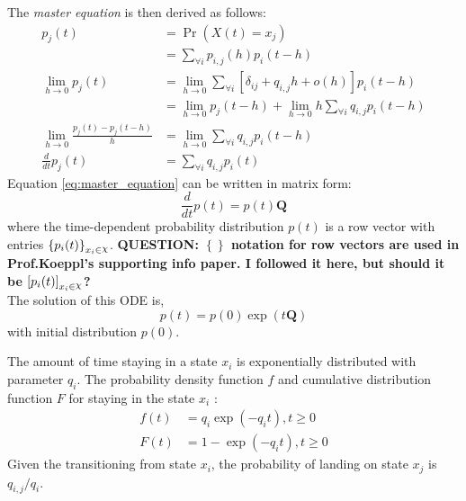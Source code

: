 The \textit{master equation} is then derived as follows:
\begin{align}
	p_{j}(t) &= \operatorname{Pr}(X(t) = x_{j}) \nonumber\\
		& =\sum_{\forall i} p_{i, j}(h) p_{i}(t-h) \nonumber \\
	\lim_{h\rightarrow 0} p_{j}(t) 
		& = \lim_{h\rightarrow 0} \sum_{\forall i} \left[ \delta_{ij}+q_{i,j} h+o(h)\right]  p_{i}(t-h) \nonumber \\ 
		& = \lim_{h\rightarrow 0} p_{j}(t-h) + \lim_{h\rightarrow 0} h \sum_{\forall i} q_{i,j} p_{i}(t-h) \nonumber \\
	\lim_{h\rightarrow 0} \frac{p_{j}(t) - p_{j}(t-h)}{h} 
		&= \lim_{h\rightarrow 0} \sum_{\forall i} q_{i,j} p_{i}(t-h) \nonumber\\
	\frac{d}{dt} p_{j}(t) & = \sum_{\forall i} q_{i,j} p_{i}(t)
	\label{eq:master_equation}
\end{align}
Equation \ref{eq:master_equation} can be written in matrix form:
\begin{equation}
\frac{d}{dt} p(t) = p(t)\textbf{Q}
\end{equation}
where the time-dependent probability distribution $ p(t) $ is a row vector with entries $ \left\lbrace p_{i}(t)\right\rbrace_{x_{i}\in \rchi} $. 
\textbf{QUESTION: $ \left\lbrace \right\rbrace  $ notation for row vectors are used in Prof.Koeppl's supporting info paper. I followed it here, but should it be $ \left[  p_{i}(t)\right]_{x_{i}\in \rchi} $?}\\
The solution of this ODE is, 
\begin{equation}
p(t)=p(0) \exp (t\textbf{Q})
\end{equation}
with initial distribution $ p(0) $.

The amount of time staying in a state $ x_{i} $ is exponentially distributed with parameter $ q_{i} $. The probability density function $ f $ and cumulative distribution function $ F $ for staying in the state $ x_{i} $ \cite{Nodelman1995}:
\begin{align}
f(t) & = q_{i} \exp \left(-q_{i} t\right), t\geq 0  \label{eq:f(t)_homo}\\
F(t) & = 1 - \exp \left(-q_{i} t\right), t\geq 0 
\end{align}
Given the transitioning from state $ x_{i} $, the probability of landing on state $ x_{j} $ is $ q_{i,j}/q_{i} $.
